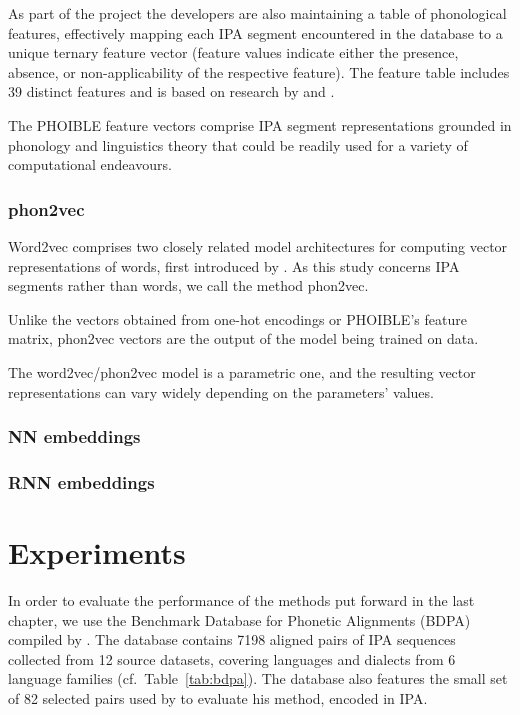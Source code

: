 \documentclass[a4paper]{report}
\begin{document}
As part of the project the developers are also maintaining a table of phonological features,
effectively mapping each IPA segment encountered in the database to a unique ternary feature vector
(feature values indicate either the presence, absence, or non-applicability of the respective feature).
The feature table includes 39 distinct features and is based on research by \citet{2009_Bruce} and \citet{2011_Moisik_al}.

The PHOIBLE feature vectors comprise IPA segment representations grounded in phonology and linguistics theory
that could be readily used for a variety of computational endeavours.


\subsection{phon2vec}

Word2vec comprises two closely related model architectures for computing vector representations of words, first introduced by \citet{2013_Mikolov_al}.
As this study concerns IPA segments rather than words, we call the method phon2vec.

Unlike the vectors obtained from one-hot encodings or PHOIBLE's feature matrix, phon2vec vectors are the output of the model being trained on data.

The word2vec/phon2vec model is a parametric one, and the resulting vector representations can vary widely depending on the parameters' values.


\subsection{NN embeddings}

\subsection{RNN embeddings}




\chapter{Experiments}

In order to evaluate the performance of the methods put forward in the last chapter,
we use the Benchmark Database for Phonetic Alignments (BDPA) compiled by \citet{2014_List_Prokić}.
The database contains 7198 aligned pairs of IPA sequences collected from 12 source datasets,
covering languages and dialects from 6 language families (cf.~Table~\ref{tab:bdpa}).
The database also features the small set of 82 selected pairs used by \citet{1996_Covington} to evaluate his method, encoded in IPA.
\end{document}

